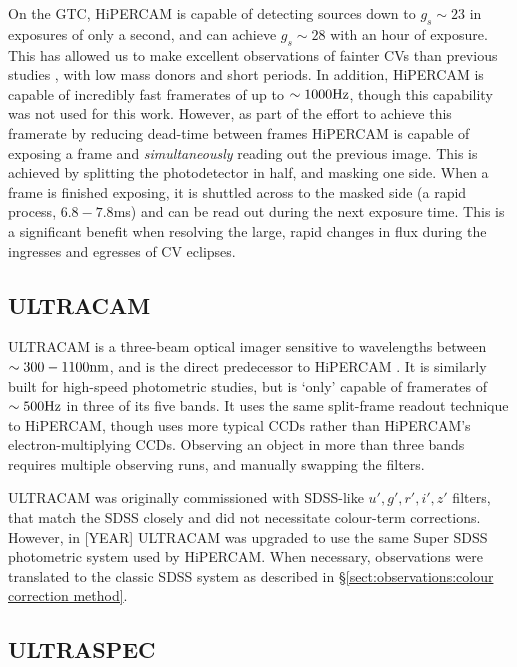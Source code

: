 On the GTC, HiPERCAM is capable of detecting sources down to $g_s \sim 23$ in exposures of only a second, and can achieve $g_s \sim 28$ with an hour of exposure. This has allowed us to make excellent observations of fainter CVs than previous studies \citep{McallisterThesis}, with low mass donors and short periods. In addition, HiPERCAM is capable of incredibly fast framerates of up to $\sim 1000 \rm Hz$, though this capability was not used for this work. 
However, as part of the effort to achieve this framerate by reducing dead-time between frames HiPERCAM is capable of exposing a frame and {\it simultaneously} reading out the previous image. 
This is achieved by splitting the photodetector in half, and masking one side. When a frame is finished exposing, it is shuttled across to the masked side (a rapid process, $6.8 - 7.8$ms) and can be read out during the next exposure time. This is a significant benefit when resolving the large, rapid changes in flux during the ingresses and egresses of CV eclipses.


\subsection{ULTRACAM}

ULTRACAM is a three-beam optical imager sensitive to wavelengths between $\sim 300 - 1100 \rm nm$, and is the direct predecessor to HiPERCAM \citep{dhillon2007}. 
It is similarly built for high-speed photometric studies, but is `only' capable of framerates of $\sim 500 \rm Hz$ in three of its five bands. 
It uses the same split-frame readout technique to HiPERCAM, though uses more typical CCDs rather than HiPERCAM's electron-multiplying CCDs. Observing an object in more than three bands requires multiple observing runs, and manually swapping the filters.

ULTRACAM was originally commissioned with SDSS-like $u',g',r',i',z'$ filters, that match the SDSS closely and did not necessitate colour-term corrections. However, in [YEAR]  ULTRACAM was upgraded to use the same Super SDSS photometric system used by HiPERCAM. When necessary, observations were translated to the classic SDSS system as described in \S\ref{sect:observations:colour correction method}. 


\subsection{ULTRASPEC}

